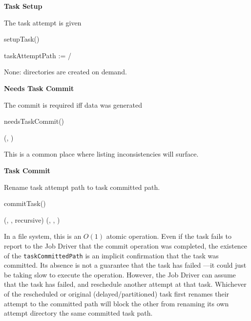 \documentclass[conference]{IEEEtran}
\begin{document}
\textbf{Task Setup}

The task attempt is given

\begin{procedure}
\caption{setupTask()}


taskAttemptPath := \jobAttemptPath/\taskAttemptId\;
\end{procedure}

None: directories are created on demand.


\textbf{Needs Task Commit}

The commit is required iff data was generated

\begin{function}
\caption{needsTaskCommit()}


\exists(\fs, \taskAttemptPath)\;
\end{function}

This is a common place where listing inconsistencies will surface.


\textbf{Task Commit}

Rename task attempt path to task committed path.

\begin{procedure}
\caption{commitTask()}

\If{\exists(\fs, \taskAttemptPath)} {
  \delete(\fs, \taskCommittedPath, recursive)\;
  \rename(\fs, \taskAttemptPath, \taskCommittedPath)\;
}
\end{procedure}


In a file system, this is an $O(1)$ atomic operation.
Even if the task fails to report to the Job Driver that the
commit operation was completed, the existence of the \texttt{taskCommittedPath}
is an implicit confirmation that the task was committed.
Its absence is not a guarantee that the task has failed ---it could just
be taking slow to execute the operation.
However, the Job Driver can assume that the task has failed,
and reschedule another attempt at that task.
Whichever of the rescheduled or original (delayed/partitioned) task
first renames their attempt to the committed path will block the other
from renaming its own attempt directory the same committed task path.
\end{document}
